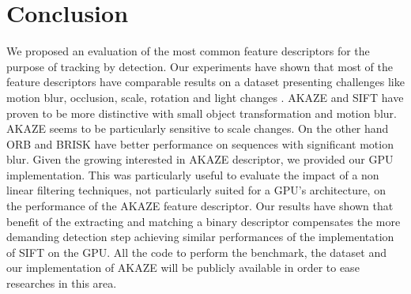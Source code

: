 \section{Conclusion}

We proposed an evaluation of the most common feature descriptors for the purpose of tracking by detection. Our experiments have shown that most of the feature descriptors have comparable results on a dataset presenting challenges like motion blur, occlusion, scale, rotation and light changes . AKAZE and SIFT have proven to be more distinctive with small object transformation and motion blur. AKAZE seems to be particularly sensitive to scale changes. On the other hand ORB and BRISK have better performance on sequences with significant motion blur. Given the growing interested in AKAZE descriptor, we provided our GPU implementation. This was particularly useful to evaluate the impact of a non linear filtering techniques, not particularly suited for a GPU's architecture, on the performance of the AKAZE feature descriptor. Our results have shown that benefit of the extracting and matching a binary descriptor compensates the more demanding detection step achieving similar performances of the implementation of SIFT on the GPU. All the code to perform the benchmark, the dataset and our implementation of AKAZE will be publicly available in order to ease researches in this area.

